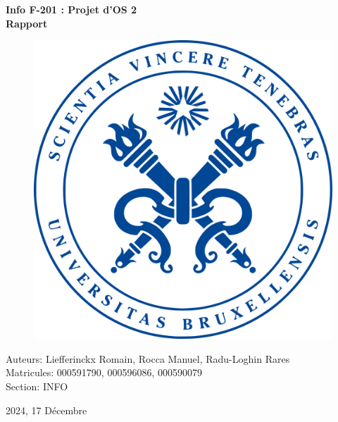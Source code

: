 \documentclass[utf8]{article}
\begin{document}
\begin{titlepage}
    \centering
    
    \vspace*{1cm}
    {\huge \bfseries Info F-201 : Projet d'OS 2\\
                    Rapport \par}
    
    \vfill
    
    \begin{figure}[h]
        \centering
        \includegraphics[scale=0.2]{logo.png}
    \end{figure}
    
    \vfill
    
    {\large Auteurs: Liefferinckx Romain, Rocca Manuel, Radu-Loghin Rares\\ 
            Matricules: 000591790, 000596086, 000590079 \\ 
            Section: INFO \par}
    {\large 2024, 17 Décembre \par}
\end{titlepage}
\end{document}
